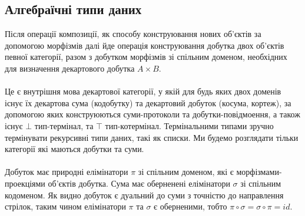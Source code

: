 \newpage
\subsection{Алгебраїчні типи даних}

    Після операції композиції, як способу конструювання нових об’єктів
    за допомогою морфізмів далі йде операція конструювання добутка двох об’єктів певної категорії,
    разом з добутком морфізмів зі спільним доменом, необхідних для визначення декартового добутка $A \times B$.

    \paragraph{}
    Це є внутрішня мова декартової категорії, у якій для будь яких двох доменів існує їх декартова сума (кодобутку)
    та декартовий добуток (косума, кортеж), за допомогою яких конструюються суми-протоколи та добутки-повідмоення,
    а також існує $\bot$ тип-термінал, та $\top$ тип-котермінал. Термінальними типами зручно термінувати рекурсивні
    типи даних, такі як списки. Ми будемо розглядати тільки категорії які маються добутки та суми.

    \paragraph{}
    Добуток має природні елімінатори $\pi$ зі спільним доменом, які є морфізмами-проекціями об’єктів добутка. Сума має оберненені
    елімінатори $\sigma$ зі спільним кодоменом. Як видно добуток є дуальний до суми з точністю до направлення стрілок,
    таким чином елімінатори $\pi$ та $\sigma$ є оберненими, тобто $\pi \circ \sigma = \sigma \circ \pi = id$.

